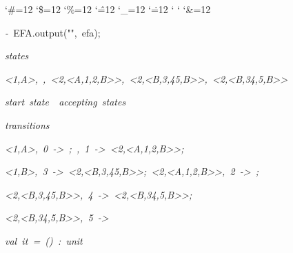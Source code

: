 \begin{list}{}
{\setlength{\leftmargin}{\leftmargini}
\setlength{\rightmargin}{0cm}
\setlength{\itemindent}{0cm}
\setlength{\listparindent}{0cm}
\setlength{\itemsep}{0cm}
\setlength{\parsep}{0cm}
\setlength{\labelsep}{0cm}
\setlength{\labelwidth}{0cm}
\catcode`\#=12
\catcode`\$=12
\catcode`\%=12
\catcode`\^=12
\catcode`\_=12
\catcode`\.=12
\catcode`
\catcode`
\catcode`\&=12
\ttfamily}
\small
\item[]\textsl{-\ }EFA.output("",\ efa);
\item[]\textsl{states}
\item[]\textsl{<1,A>,\ <1,B>,\ <2,<A,1,2,B>>,\ <2,<B,3,45,B>>,\ <2,<B,34,5,B>>}
\item[]\textsl{start\ state\ <1,A>\ accepting\ states\ <1,B>}
\item[]\textsl{transitions}
\item[]\textsl{<1,A>,\ 0\ ->\ <1,A>;\ <1,A>,\ 1\ ->\ <2,<A,1,2,B>>;}
\item[]\textsl{<1,B>,\ 3\ ->\ <2,<B,3,45,B>>;\ <2,<A,1,2,B>>,\ 2\ ->\ <1,B>;}
\item[]\textsl{<2,<B,3,45,B>>,\ 4\ ->\ <2,<B,34,5,B>>;}
\item[]\textsl{<2,<B,34,5,B>>,\ 5\ ->\ <1,B>}
\item[]\textsl{val\ it\ =\ ()\ :\ unit}
\end{list}
